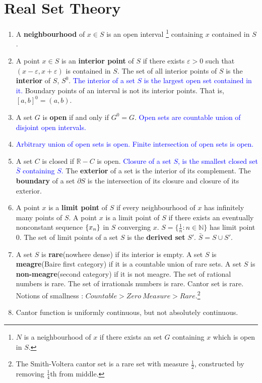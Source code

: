 \section{Real Set Theory}
\begin{enumerate}
	\item A \textbf{neighbourhood} of $x \in S$ is an open interval \footnote{$N$ is a neighbourhood of $x$ if there exists an set $G$ containing $x$ which is open in $S$.} containing $x$ contained in $S$.
	\item A point $x \in S$ is an \textbf{interior point} of $S$ if there exists $\varepsilon > 0$ such that $(x-\varepsilon, x+\varepsilon)$ is contained in $S$. The set of all interior points of $S$ is the \textbf{interior} of $S$, $S^0$. 
		\subitem \textcolor{blue}{The interior of a set $S$ is the largest open set contained in it.}
		\subitem Boundary points of an interval is not its interior points. That is, $[a,b]^0 = (a,b)$.
	\item A set $G$ is \textbf{open} if and only if $G^0 = G$.
		\subitem \textcolor{blue}{Open sets are countable union of disjoint open intervals.}
	\item \textcolor{blue}{Arbitrary union of open sets is open. Finite intersection of open sets is open.}
	\item A set $C$ is closed if $\mathbb{R}-C$ is open.
		\subitem \textcolor{blue}{Closure of a set $S$, is the smallest closed set $\bar{S}$ containing $S$.}
		\subitem The \textbf{exterior} of a set is the interior of its complement. The \textbf{boundary} of a set $\partial S$ is the intersection of its closure and closure of its exterior.
	\item A point $x$ is a \textbf{limit point} of $S$ if every neighbourhood of $x$ has infinitely many points of $S$.
		\subitem A point $x$ is a limit point of $S$ if there exists an eventually nonconstant sequence $\{x_n\}$ in $S$ converging $x$.
		\subitem $S = \{ \frac{1}{n} : n \in \mathbb{N} \}$ has limit point $0$.
		\subitem The set of limit points of a set $S$ is the \textbf{derived set} $S'$.
		\subitem $\bar{S} = S \cup S'$.
	\item A set $S$ is \textbf{rare}(nowhere dense) if its interior is empty. A set $S$ is \textbf{meagre}(Baire first category) if it is a countable union of rare sets. A set $S$ is \textbf{non-meagre}(second category) if it is not meagre.
		\subitem The set of rational numbers is rare.
		\subitem The set of irrationals numbers is rare.
		\subitem Cantor set is rare.  \subitem Notions of smallness : $Countable > Zero\ Measure > Rare$.\footnote{The Smith-Voltera cantor set is a rare set with measure $\frac{1}{2}$, constructed by removing $\frac{1}{4}$th from middle.} \item \subitem Cantor function is uniformly continuous, but not absolutely continuous.

\end{enumerate}
